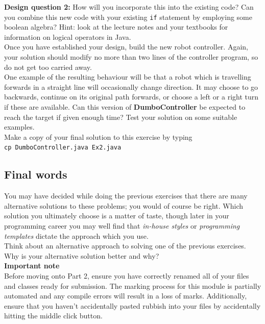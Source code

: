 \noindent
{\bf Design question 2:} 
How will you incorporate this into the existing code? Can you combine 
this new code with your existing {\tt if} statement by employing 
some boolean algebra? Hint: look at the lecture notes and your textbooks 
for information on logical operators in Java. \\

\noindent
Once you have established your design, build the new robot controller. 
Again, your solution should modify no more than two lines of the
controller program, so do not get too carried away. \\

\noindent
One example of the resulting behaviour 
will be that a robot which is travelling forwards in a straight line will
occasionally change direction. It may choose to go backwards,
continue on its original path forwards, or choose a left or a right
turn if these are available. Can this version of {\bf DumboController} be
expected to reach the target if given enough time? Test your solution on 
some suitable examples. \\

\noindent
Make a copy of your final solution to this exercise by typing \\

{\tt cp DumboController.java Ex2.java}

\subsection{Final words}

You may have decided while doing the previous exercises that there are many 
alternative solutions to these problems; you would of course be right. Which
solution you ultimately choose is a matter of taste, though later in your 
programming career you may well find that {\em in-house styles} or 
{\em programming templates} dictate the approach which you use. \\

\noindent
Think about an alternative approach to solving one of the previous exercises. 
Why is your alternative solution better and why?\\

\noindent
{\bf Important note}\\

\noindent
Before moving onto Part 2, ensure you have correctly renamed all of your files and classes ready for submission. The marking process for this module is partially automated and any compile errors will result in a loss of marks. Additionally, ensure that you haven't accidentally pasted rubbish into your files by accidentally hitting the middle click button.


